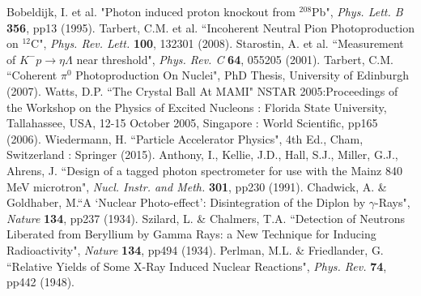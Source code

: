 \documentclass[a4paper,12pt]{article}
\begin{document}
\begin{thebibliography}{99}
 Bobeldijk, I. et al. "Photon induced proton knockout from $^{208}$Pb", \textit{Phys. Lett. B} \textbf{356}, pp13 (1995). 
 Tarbert, C.M. et al. ``Incoherent Neutral Pion Photoproduction on $^{12}$C", \textit{Phys. Rev. Lett.} \textbf{100}, 132301 (2008).
 Starostin, A. et al. ``Measurement of $K^{-}p \rightarrow \eta \Lambda$ near threshold", \textit{Phys. Rev. C} \textbf{64}, 055205 (2001).
 Tarbert, C.M. ``Coherent $\pi^{0}$ Photoproduction On Nuclei", PhD Thesis, University of Edinburgh (2007).
 Watts, D.P. ``The Crystal Ball At MAMI" NSTAR 2005:Proceedings of the Workshop on the Physics of Excited Nucleons : Florida State University, Tallahassee, USA, 12-15 October 2005, Singapore : World Scientific, pp165 (2006).
 Wiedermann, H. ``Particle Accelerator Physics", 4th Ed., Cham, Switzerland : Springer (2015).
 Anthony, I., Kellie, J.D., Hall, S.J., Miller, G.J., Ahrens, J. ``Design of a tagged photon spectrometer for use with the Mainz 840 MeV microtron", \textit{Nucl. Instr. and Meth.} \textbf{301}, pp230 (1991).
 Chadwick, A. \& Goldhaber, M.``A `Nuclear Photo-effect': Disintegration of the Diplon by $\gamma$-Rays", \textit{Nature} \textbf{134}, pp237 (1934).
 Szilard, L. \& Chalmers, T.A. ``Detection of Neutrons Liberated from Beryllium by Gamma Rays: a New Technique for Inducing Radioactivity", \textit{Nature} \textbf{134}, pp494 (1934).
 Perlman, M.L. \& Friedlander, G. ``Relative Yields of Some X-Ray Induced Nuclear Reactions", \textit{Phys. Rev.} \textbf{74}, pp442 (1948).

\end{thebibliography}
\end{document}
